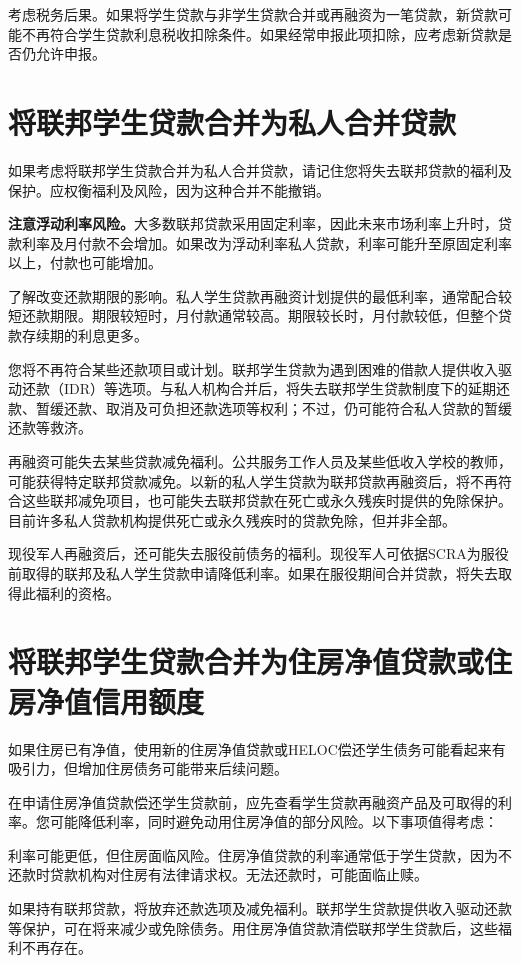 \documentclass[UTF8,fontset=none,11pt,a4paper]{ctexart}
\begin{document}
考虑税务后果。如果将学生贷款与非学生贷款合并或再融资为一笔贷款，新贷款可能不再符合学生贷款利息税收扣除条件。如果经常申报此项扣除，应考虑新贷款是否仍允许申报。


\section*{将联邦学生贷款合并为私人合并贷款}
如果考虑将联邦学生贷款合并为私人合并贷款，请记住您将失去联邦贷款的福利及保护。应权衡福利及风险，因为这种合并不能撤销。


\textbf{注意浮动利率风险。}大多数联邦贷款采用固定利率，因此未来市场利率上升时，贷款利率及月付款不会增加。如果改为浮动利率私人贷款，利率可能升至原固定利率以上，付款也可能增加。


了解改变还款期限的影响。私人学生贷款再融资计划提供的最低利率，通常配合较短还款期限。期限较短时，月付款通常较高。期限较长时，月付款较低，但整个贷款存续期的利息更多。


您将不再符合某些还款项目或计划。联邦学生贷款为遇到困难的借款人提供收入驱动还款（IDR）等选项。与私人机构合并后，将失去联邦学生贷款制度下的延期还款、暂缓还款、取消及可负担还款选项等权利；不过，仍可能符合私人贷款的暂缓还款等救济。


再融资可能失去某些贷款减免福利。公共服务工作人员及某些低收入学校的教师，可能获得特定联邦贷款减免。以新的私人学生贷款为联邦贷款再融资后，将不再符合这些联邦减免项目，也可能失去联邦贷款在死亡或永久残疾时提供的免除保护。目前许多私人贷款机构提供死亡或永久残疾时的贷款免除，但并非全部。


现役军人再融资后，还可能失去服役前债务的福利。现役军人可依据SCRA为服役前取得的联邦及私人学生贷款申请降低利率。如果在服役期间合并贷款，将失去取得此福利的资格。


\section*{将联邦学生贷款合并为住房净值贷款或住房净值信用额度}
如果住房已有净值，使用新的住房净值贷款或HELOC偿还学生债务可能看起来有吸引力，但增加住房债务可能带来后续问题。


在申请住房净值贷款偿还学生贷款前，应先查看学生贷款再融资产品及可取得的利率。您可能降低利率，同时避免动用住房净值的部分风险。以下事项值得考虑：


利率可能更低，但住房面临风险。住房净值贷款的利率通常低于学生贷款，因为不还款时贷款机构对住房有法律请求权。无法还款时，可能面临止赎。


如果持有联邦贷款，将放弃还款选项及减免福利。联邦学生贷款提供收入驱动还款等保护，可在将来减少或免除债务。用住房净值贷款清偿联邦学生贷款后，这些福利不再存在。
\end{document}
